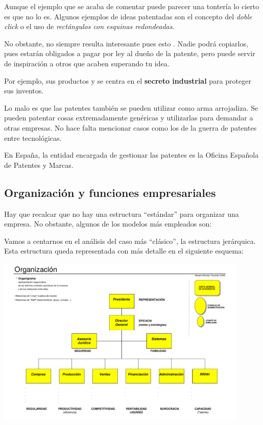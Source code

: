 \documentclass[nochap,palatino,shortheader]{apuntes}
\begin{document}
Aunque el ejemplo que se acaba de comentar puede parecer una tontería lo cierto es que no lo es. Algunos ejemplos de ideas patentadas son el concepto del \textit{doble click} o el uso de \textit{rectángulos con esquinas redondeadas}.

No obstante, no siempre resulta interesante  pues esto . Nadie podrá copiarlos, pues estarán obligados a pagar por ley al dueño de la patente, pero puede servir de inspiración a otros que acaben superando tu idea.

Por ejemplo,  sus productos y se centra en el \textbf{secreto industrial} para proteger sus inventos.

Lo malo es que las patentes también se pueden utilizar como arma arrojadiza. Se pueden patentar cosas extremadamente genéricas y utilizarlas para demandar a otras empresas. No hace falta mencionar casos como los de la guerra de patentes entre tecnológicas.

En España, la entidad encargada de gestionar las patentes es la Oficina Española de Patentes y Marcas.

\subsection{Organización y funciones empresariales}

Hay que recalcar que no hay una estructura ``estándar'' para organizar una empresa. No obstante, algunos de los modelos más empleados son:

Vamos a centarnos en el análisis del caso más ``clásico'', la estructura jerárquica. Esta estructura queda representada con más detalle en el siguiente esquema:

\begin{center}
\includegraphics[width=0.9\textwidth]{img/organizacionEmpresa.png}
\label{fig:organizacionEmpresa}
\end{center}
\end{document}
